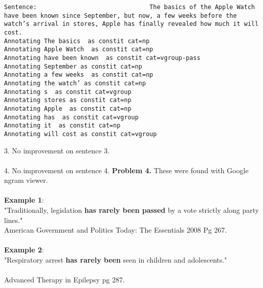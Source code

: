 \documentclass{article}
\begin{document}
\begin{verbatim}
Sentence:                               The basics of the Apple Watch have been known since September, but now, a few weeks before the watch’s arrival in stores, Apple has finally revealed how much it will cost.
Annotating The basics  as constit cat=np
Annotating Apple Watch  as constit cat=np
Annotating have been known  as constit cat=vgroup-pass
Annotating September as constit cat=np
Annotating a few weeks  as constit cat=np
Annotating the watch’ as constit cat=np
Annotating s  as constit cat=vgroup
Annotating stores as constit cat=np
Annotating Apple  as constit cat=np
Annotating has  as constit cat=vgroup
Annotating it  as constit cat=np
Annotating will cost as constit cat=vgroup

\end{verbatim}
3.  No improvement on sentence 3.
\\ 
\\
4.  No improvement on sentence 4.
\newpage
\textbf{Problem 4.}
These were found with Google ngram viewer. \\ \\
\textbf{Example 1}:
\\ "Traditionally, legislation \textbf{ has rarely been passed } by a vote strictly along party lines."
\\
American Government and Politics Today: The Essentials 2008 Pg 267. 
\\ \\
\textbf{Example 2}: 
\\ "Respiratory arrest \textbf{has rarely been} seen in children and adolescents."
\\ \\
Advanced Therapy in Epilepsy pg 287.
\end{document}

